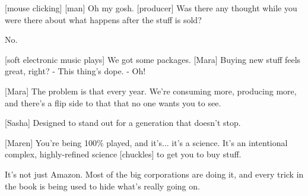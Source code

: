 \documentclass[a4paper]{article}
\begin{document}
	[mouse clicking]
	[man] Oh my gosh.
	[producer] Was there any thought while you were there about what happens after the stuff is sold?
	
	
	No.
	
	[soft electronic music plays]
	We got some packages.
	[Mara] Buying new stuff feels great, right?
	- This thing's dope. - Oh!
	
	[Mara] The problem is that every year. We're consuming more, producing more, and there's a flip side to that that no one wants you to see.
	
	[Sasha] Designed to stand out for a generation that doesn't stop.
	
	[Maren] You're being 100\% played, and it's... it's a science. It's an intentional complex, highly-refined science [chuckles] to get you to buy stuff.
	
	It's not just Amazon.
	Most of the big corporations are doing it, and every trick in the book is being used to hide what's really going on.
	
\end{document}
